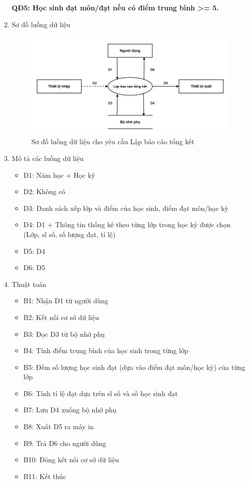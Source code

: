 \documentclass[a4paper]{article}
\begin{document}
\begin{enumerate}[label=\alph*.]
\textbf{QĐ5: Học sinh đạt môn/đạt nếu có điểm trung bình >= 5. } 	
\item Sơ đồ luồng dữ liệu
\begin{figure}[H] 
    \centering
    \includegraphics[width=1\textwidth]{dfd5} %
    \caption{Sơ đồ luồng dữ liệu cho yêu cầu Lập báo cáo tổng kết }
    \label{fig:example} %
\end{figure}	
\item Mô tả các luồng dữ liệu
\begin{itemize}
\item D1: Năm học + Học kỳ
\item D2: Không có
\item D3: Danh sách xếp lớp và điểm của học sinh, điểm đạt môn/học kỳ
\item D4: D1 + Thông tin thống kê theo từng lớp trong học kỳ được chọn (Lớp, sĩ số, số lượng đạt, tỉ lệ)
\item D5: D4
\item D6: D5

\end{itemize}
\item Thuật toán
\begin{itemize}
\item B1: Nhận D1 từ người dùng
\item B2: Kết nối cơ sở dữ liệu
\item B3: Đọc D3 từ bộ nhớ phụ
\item B4: Tính điểm trung bình của học sinh trong từng lớp
\item B5: Đếm số lượng học sinh đạt (dựa vào điểm đạt môn/học kỳ) của từng lớp
\item B6: Tính tỉ lệ đạt dựa trên sĩ số và số học sinh đạt
\item B7: Lưu D4 xuống bộ nhớ phụ
\item B8: Xuất D5 ra máy in
\item B9: Trả D6 cho người dùng
\item B10: Đóng kết nối cơ sở dữ liệu
\item B11: Kết thúc
\end{itemize}

\end{enumerate}	
\end{document}
